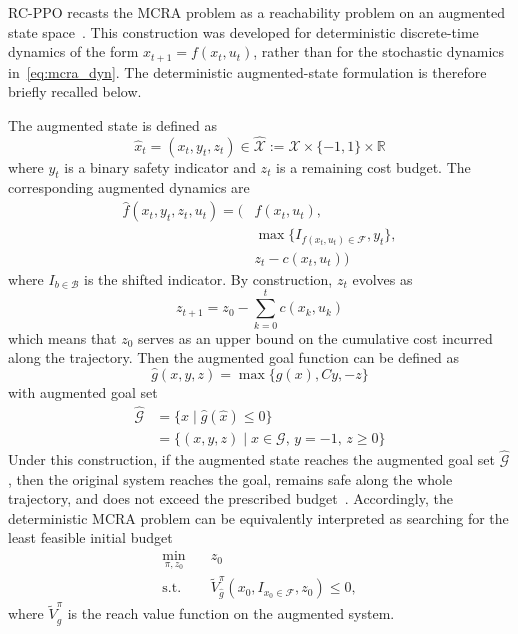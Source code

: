 \documentclass{article}
\begin{document}
RC-PPO recasts the MCRA problem as a reachability problem on an augmented state space~\citep{so2024}. This construction was developed for deterministic discrete-time dynamics of the form $x_{t+1}=f(x_t,u_t)$, rather than for the stochastic dynamics in~\eqref{eq:mcra_dyn}. The deterministic augmented-state formulation is therefore briefly recalled below.

The augmented state is defined as
\begin{equation}
\hat{x}_t=(x_t,y_t,z_t)\in \hat{\mathcal{X}}:=\mathcal{X}\times\{-1,1\}\times\mathbb{R}
\end{equation}
where $y_t$ is a binary safety indicator and $z_t$ is a remaining cost budget. The corresponding augmented dynamics are
\begin{equation}
\begin{aligned}
\hat{f}(x_t,y_t,z_t,u_t)
= \big(&f(x_t,u_t), \\
&\max\{I_{f(x_t,u_t)\in\mathcal{F}},y_t\}, \\
&z_t-c(x_t,u_t)\big)
\end{aligned}
\end{equation}
where $I_{b\in\mathcal{B}}$ is the shifted indicator. By construction, $z_t$ evolves as
\begin{equation}
z_{t+1}=z_0-\sum_{k=0}^{t} c(x_k,u_k)
\end{equation}
which means that $z_0$ serves as an upper bound on the cumulative cost incurred along the trajectory. Then the augmented goal function can be defined as
\begin{equation}
\hat{g}(x,y,z)=\max\{g(x),Cy,-z\}
\end{equation}
with augmented goal set
\begin{equation}
\begin{aligned}
\hat{\mathcal{G}}
&=\{\hat{x}\mid \hat{g}(\hat{x})\le 0\} \\
&=\{(x,y,z)\mid x\in\mathcal{G},\, y=-1,\, z\ge 0\}
\end{aligned}
\end{equation}
Under this construction, if the augmented state reaches the augmented goal set $\hat{\mathcal{G}}$, then the original system reaches the goal, remains safe along the whole trajectory, and does not exceed the prescribed budget~\citep{so2024}. Accordingly, the deterministic MCRA problem can be equivalently interpreted as searching for the least feasible initial budget
\begin{equation}
\begin{aligned}
\min_{\pi,z_0}\quad & z_0 \\
\mathrm{s.t.}\quad & \tilde{V}^{\pi}_{\hat{g}}(x_0,I_{x_0\in\mathcal{F}},z_0)\le 0,
\end{aligned}
\end{equation}
where $\tilde{V}^{\pi}_{\hat{g}}$ is the reach value function on the augmented system.
\end{document}
